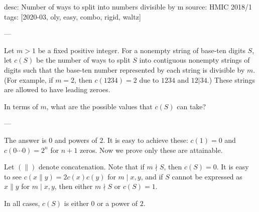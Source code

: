desc: Number of ways to split into numbers divisible by m
source: HMIC 2018/1
tags: [2020-03, oly, easy, combo, rigid, waltz]

---

Let $m>1$ be a fixed positive integer. For a nonempty string of base-ten digits $S$, let $c(S)$ be the number of ways to split $S$ into contiguous nonempty strings of digits such that the base-ten number represented by each string is divisible by $m$. (For example, if $m=2$, then $c(1234)=2$ due to $1234$ and $12|34$.) These strings are allowed to have leading zeroes. 

In terms of $m$, what are the possible values that $c(S)$ can take?

---

The answer is $0$ and powers of $2$. It is easy to achieve these: $c(1)=0$ and $c(0\cdots0)=2^n$ for $n+1$ zeros. Now we prove only these are attainable.

Let $(\|)$ denote concatenation. Note that if $m\nmid S$, then $c(S)=0$. It is easy to see $c(x\|y)=2c(x)c(y)$ for $m\mid x,y$, and if $S$ cannot be expressed as $x\|y$ for $m\mid x,y$, then either $m\nmid S$ or $c(S)=1$.

In all cases, $c(S)$ is either $0$ or a power of $2$.
